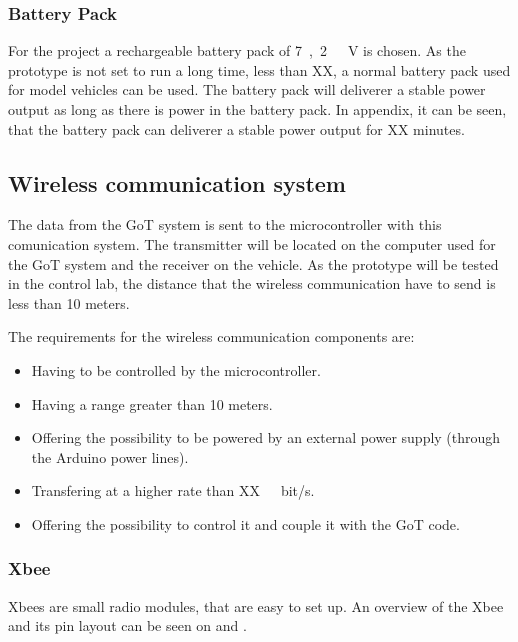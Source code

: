 \subsubsection{Battery Pack}
For the project a rechargeable battery pack of \si{7,2\ V} is chosen. As the prototype is not set to run a long time, less than XX, a normal battery pack used for model vehicles can be used. The battery pack will deliverer a stable power output as long as there is power in the battery pack. In appendix, it can be seen, that the battery pack can deliverer a stable power output for XX minutes.


\subsection{Wireless communication system}
The data from the GoT system is sent to the microcontroller with this comunication system. The transmitter will be located on the computer used for the GoT system and the receiver on the vehicle. As the prototype will be tested in the control lab, the distance that the wireless communication have to send is less than 10 meters.

The requirements for the wireless communication components are:
\begin{itemize}
\item Having to be controlled by the microcontroller.
\item Having a range greater than 10 meters. 
\item Offering the possibility to be powered by an external power supply (through the Arduino power lines).
\item Transfering at a higher rate than \si{XX\ bit/s}. 
\item Offering the possibility to control it and couple it with the GoT code.
\end{itemize}

\subsubsection{Xbee}
Xbees are small radio modules, that are easy to set up. An overview of the Xbee and its pin layout can be seen on  and .


